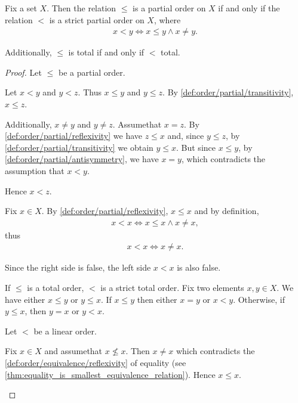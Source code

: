 \begin{proposition}\label{thm:strict_partial_order_conversion}
  Fix a set \( X \). Then the relation \( \leq \) is a partial order on \( X \) if and only if the relation \( < \) is a strict partial order on \( X \), where
  \begin{align*}
    x < y \iff x \leq y \land x \neq y.
  \end{align*}

  Additionally, \( \leq \) is total if and only if \( < \) total.
\end{proposition}
\begin{proof}
  \Implies Let \( \leq \) be a partial order.
  \begin{description}
     Let \( x < y \) and \( y < z \). Thus \( x \leq y \) and \( y \leq z \). By \ref{def:order/partial/transitivity}, \( x \leq z \).

    Additionally, \( x \neq y \) and \( y \neq z \). Assume\LEM that \( x = z \). By \ref{def:order/partial/reflexivity} we have \( z \leq x \) and, since \( y \leq z \), by \ref{def:order/partial/transitivity} we obtain \( y \leq x \). But since \( x \leq y \), by \ref{def:order/partial/antisymmetry}, we have \( x = y \), which contradicts the assumption that \( x < y \).

    Hence \( x < z \).

     Fix \( x \in X \). By \ref{def:order/partial/reflexivity}, \( x \leq x \) and by definition,
    \begin{align*}
      x < x \iff x \leq x \land x \neq x,
    \end{align*}
    thus
    \begin{align*}
      x < x \iff x \neq x.
    \end{align*}

    Since the right side is false, the left side \( x < x \) is also false.

     If \( \leq \) is a total order, \( < \) is a strict total order. Fix two elements \( x, y \in X \). We have either \( x \leq y \) or \( y \leq x \). If \( x \leq y \) then either \( x = y \) or \( x < y \). Otherwise, if \( y \leq x \), then \( y = x \) or \( y < x \).
  \end{description}

  \ImpliedBy Let \( < \) be a linear order.
  \begin{description}
     Fix \( x \in X \) and assume\LEM that \( x \not\leq x \). Then \( x \neq x \) which contradicts the \ref{def:order/equivalence/reflexivity} of equality (see \cref{thm:equality_is_smallest_equivalence_relation}). Hence \( x \leq x \).


\end{description}
\end{proof}
